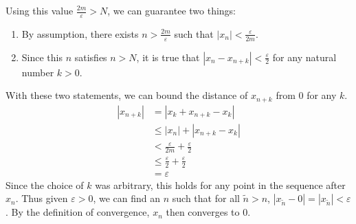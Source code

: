 \documentclass[10pt]{amsart}
\theoremstyle{plain}
\theoremstyle{definition}
\newcommand{\<}{\langle}
\renewcommand{\>}{\rangle}
\begin{document}
Using this value $\frac{2m}{\varepsilon} > N$, we can guarantee two things:
\begin{enumerate}
	\item By assumption, there exists $n > \frac{2m}{\varepsilon}$ such that $|x_n| < \frac{\varepsilon}{2m} $.
	\item Since this $n$ satisfies $n > N$, it is true that $|x_n - x_{n+k}| < \frac{\varepsilon}{2}$ for any natural number $k > 0$.
\end{enumerate}
With these two statements, we can bound the distance of $x_{n+k}$ from $0$ for any $k$.
\begin{align*}
|x_{n+k}| &= |x_k + x_{n+k} - x_k| \\
	  &\leq |x_n| + |x_{n+k} - x_k| \\
	  &< \frac{\varepsilon}{2m} + \frac{\varepsilon}{2} \\
	  &\leq \frac{\varepsilon}{2} + \frac{\varepsilon}{2} \\
	  &= \varepsilon
\end{align*}
Since the choice of $k$ was arbitrary, this holds for any point in the sequence after $x_n$. Thus given $\varepsilon > 0$, we can find an $n$ such that for all $\tilde{n}>n$, $|x_{\tilde{n}}-0| = |x_{\tilde{n}}| < \varepsilon$. By the definition of convergence, $x_n$ then converges to 0.
\end{document}
